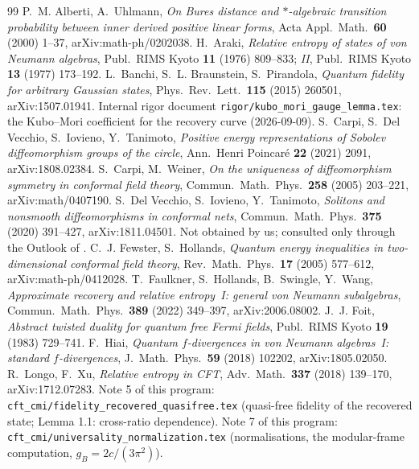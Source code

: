 \documentclass[11pt,a4paper]{article}
\theoremstyle{definition}\newtheorem{definition}[theorem]{Definition}\newtheorem{remark}[theorem]{Remark}\newtheorem{hypothesis}[theorem]{Hypothesis}
\newcommand{\gB}{g_{B}}\newcommand{\gKM}{g_{\mathrm{KM}}}
\begin{document}
\begin{thebibliography}{99}
 P.~M. Alberti, A.~Uhlmann, \emph{On Bures distance and $*$-algebraic transition probability
between inner derived positive linear forms}, Acta Appl.\ Math.\ \textbf{60} (2000) 1--37,
arXiv:math-ph/0202038.
 H.~Araki, \emph{Relative entropy of states of von Neumann algebras}, Publ.\ RIMS Kyoto
\textbf{11} (1976) 809--833; \emph{II}, Publ.\ RIMS Kyoto \textbf{13} (1977) 173--192.
 L.~Banchi, S.~L. Braunstein, S.~Pirandola, \emph{Quantum fidelity for arbitrary Gaussian
states}, Phys.\ Rev.\ Lett.\ \textbf{115} (2015) 260501, arXiv:1507.01941.
 Internal rigor document \texttt{rigor/kubo\_mori\_gauge\_lemma.tex}: the Kubo--Mori coefficient for the recovery curve (2026-09-09).
 S.~Carpi, S.~Del Vecchio, S.~Iovieno, Y.~Tanimoto, \emph{Positive energy representations of
Sobolev diffeomorphism groups of the circle}, Ann.\ Henri Poincar\'e \textbf{22} (2021) 2091,
arXiv:1808.02384.
 S.~Carpi, M.~Weiner, \emph{On the uniqueness of diffeomorphism symmetry in conformal field
theory}, Commun.\ Math.\ Phys.\ \textbf{258} (2005) 203--221, arXiv:math/0407190.
 S.~Del Vecchio, S.~Iovieno, Y.~Tanimoto, \emph{Solitons and nonsmooth diffeomorphisms in
conformal nets}, Commun.\ Math.\ Phys.\ \textbf{375} (2020) 391--427, arXiv:1811.04501.  Not obtained by
us; consulted only through the Outlook of \cite{CDIT}.
 C.~J. Fewster, S.~Hollands, \emph{Quantum energy inequalities in two-dimensional conformal
field theory}, Rev.\ Math.\ Phys.\ \textbf{17} (2005) 577--612, arXiv:math-ph/0412028.
 T.~Faulkner, S.~Hollands, B.~Swingle, Y.~Wang, \emph{Approximate recovery and relative
entropy~I: general von Neumann subalgebras}, Commun.\ Math.\ Phys.\ \textbf{389} (2022) 349--397,
arXiv:2006.08002.
 J.~J. Foit, \emph{Abstract twisted duality for quantum free Fermi fields}, Publ.\ RIMS Kyoto
\textbf{19} (1983) 729--741.
 F.~Hiai, \emph{Quantum $f$-divergences in von Neumann algebras~I: standard
$f$-divergences}, J.\ Math.\ Phys.\ \textbf{59} (2018) 102202, arXiv:1805.02050.
 R.~Longo, F.~Xu, \emph{Relative entropy in CFT}, Adv.\ Math.\ \textbf{337} (2018) 139--170,
arXiv:1712.07283.
 Note 5 of this program: \texttt{cft\_cmi/fidelity\_recovered\_quasifree.tex} (quasi-free
fidelity of the recovered state; Lemma 1.1: cross-ratio dependence).
 Note 7 of this program: \texttt{cft\_cmi/universality\_normalization.tex} (normalisations,
the modular-frame computation, $\gB=2c/(3\pi^{2})$).

\end{thebibliography}
\end{document}
